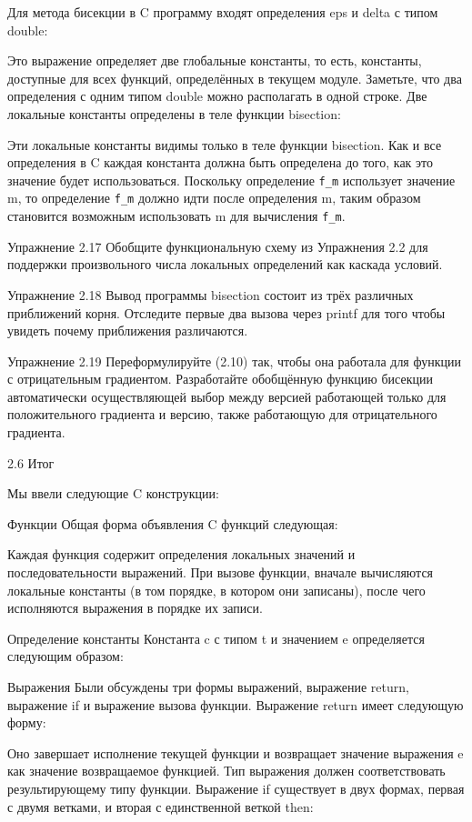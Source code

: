 Для метода бисекции в C программу входят определения eps и delta с типом double:

Это выражение определяет две глобальные константы, то есть, константы, доступные для всех функций, определённых в текущем модуле. Заметьте, что два определения с одним типом double можно располагать в одной строке. Две локальные константы определены в теле функции bisection:

Эти локальные константы видимы только в теле функции bisection. Как и все определения в C каждая константа должна быть определена до того, как это значение будет использоваться. Поскольку определение \lstinline|f_m| использует значение m, то определение \lstinline|f_m| должно идти после определения m, таким образом становится возможным использовать m для вычисления \lstinline|f_m|.

Упражнение 2.17 Обобщите функциональную схему из Упражнения 2.2 для поддержки произвольного числа локальных определений как каскада условий.

Упражнение 2.18 Вывод программы bisection состоит из трёх различных приближений корня. Отследите первые два вызова через printf для того чтобы увидеть почему приближения различаются.

Упражнение 2.19 Переформулируйте (2.10) так, чтобы она работала для функции с отрицательным градиентом. Разработайте обобщённую функцию бисекции автоматически осуществляющей выбор между версией работающей только для положительного градиента и версию, также работающую для отрицательного градиента.

2.6 Итог

Мы ввели следующие C конструкции:

Функции Общая форма объявления C функций следующая:

Каждая функция содержит определения локальных значений и последовательности выражений. При вызове функции, вначале вычисляются локальные константы (в том порядке, в котором они записаны), после чего исполняются выражения в порядке их записи.

Определение константы Константа c с типом t и значением e определяется следующим образом:

Выражения Были обсуждены три формы выражений, выражение return, выражение if и выражение вызова функции. Выражение return имеет следующую форму:

Оно завершает исполнение текущей функции и возвращает значение выражения e как значение возвращаемое функцией. Тип выражения должен соответствовать результирующему типу функции. Выражение if существует в двух формах, первая с двумя ветками, и вторая с единственной веткой then:

